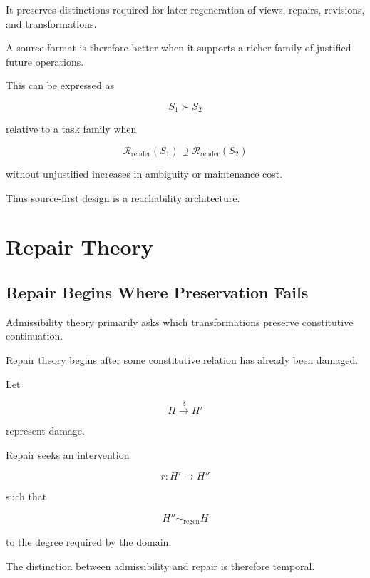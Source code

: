\documentclass[11pt]{article}
\theoremstyle{remark}
\newcommand{\Reach}{\mathcal{R}}
\begin{document}
It preserves distinctions required for later regeneration of views, repairs, revisions, and transformations.

A source format is therefore better when it supports a richer family of justified future operations.

This can be expressed as

\begin{equation}
S_1\succ S_2
\end{equation}

relative to a task family when

\begin{equation}
\Reach_{\mathrm{render}}(S_1)
\supsetneq
\Reach_{\mathrm{render}}(S_2)
\end{equation}

without unjustified increases in ambiguity or maintenance cost.

Thus source-first design is a reachability architecture.

\section{Repair Theory}

\subsection{Repair Begins Where Preservation Fails}

Admissibility theory primarily asks which transformations preserve constitutive continuation.

Repair theory begins after some constitutive relation has already been damaged.

Let

\begin{equation}
H
\xrightarrow{\delta}
H'
\end{equation}

represent damage.

Repair seeks an intervention

\begin{equation}
r:H'\rightarrow H''
\end{equation}

such that

\begin{equation}
H''
\sim_{\mathrm{regen}}
H
\end{equation}

to the degree required by the domain.

The distinction between admissibility and repair is therefore temporal.
\end{document}

